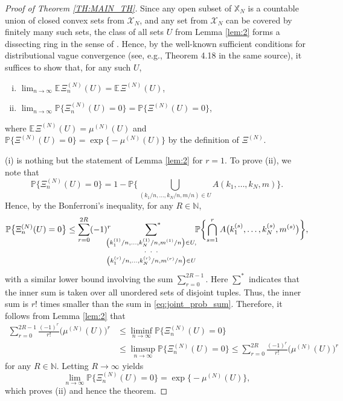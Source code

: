 \documentclass[11pt]{article}
\newcommand{\hs}{\hspace{1pt}}
\newcommand{\X}{\mathbb{X}}
\newcommand{\N}{\mathbb{N}}
\newcommand{\E}{\mathbb{E}}
\newcommand{\1}[1][]{
	\ifx&#1&\mathds{1}
	\else\mathds{1}\left\{#1\right\}\fi}
\theoremstyle{definition}
\theoremstyle{remark}
\numberwithin{equation}{section}
\begin{document}
	\begin{proof}[Proof of Theorem \ref{TH:MAIN_TH}]
		Since any open subset of $\X_N$ is a countable union of closed convex sets from $\mathcal X_N$,
		and any set from $\mathcal X_N$ can be covered by finitely many such sets, the class of all sets $U$ from
		Lemma \ref{lem:2} forms a dissecting ring in the sense of \cite[p.~24]{K17}.
		Hence, by the well-known sufficient conditions for distributional vague convergence
		(see, e.g., Theorem 4.18 in the same source), it suffices to show that, for any such $U$,
		\begin{enumerate}[(i)]
			\item $\lim_{n\to\infty}\E\hs\Xi_n^{(N)}(U) = \E\hs\Xi^{(N)}(U)$,
			\item $\lim_{n\to\infty}\mathbb{P}\bigl\{\Xi_n^{(N)}(U)=0\bigr\} = \mathbb{P}\bigl\{\Xi^{(N)}(U)=0\bigr\}$,
		\end{enumerate}
		where $\E\hs\Xi^{(N)}(U) = \mu^{(N)}(U)$ and $\mathbb{P}\bigl\{\Xi^{(N)}(U)=0\bigr\} = \exp\bigl\{-\mu^{(N)}(U)\bigr\}$        
		by the definition of $\Xi^{(N)}$.
		
		(i) is nothing but the statement of Lemma \ref{lem:2} for $r=1$. To prove (ii), we note that        
		\begin{equation*}
			\mathbb{P}\bigl\{\Xi_n^{(N)}(U)=0\bigr\} = 
			1 - \mathbb{P}\biggl\{\bigcup_{(k_1/n,\ldots,k_N/n,m/n)\in U}\!\!\!A(k_1,\dots,k_N,m)\biggr\}.
		\end{equation*}
		Hence, by the Bonferroni's inequality, for any $R\in\N$, 
		\begin{equation*}
			\mathbb{P}\bigl\{\Xi_n^{(N)}(U)=0\bigr\}\le \sum_{r=0}^{2R}(-1)^r\!\!
			\sideset{}{^*}\sum_{\substack{
					\left(k_1^{(1)}/n,\ldots,k_N^{(1)}/n, m^{(1)}/n\right)\in U,\\[2pt]
					\cdot\;\;\cdot\;\;\cdot\\[2pt]
					\left(k_1^{(r)}/n,\ldots,k_N^{(r)}/n, m^{(r)}/n\right)\in U
			}}\!\!
			\mathbb{P}\biggl\{\bigcap_{s=1}^r A{\bigl(k_1^{(s)}, \ldots,k_N^{(s)},m^{(s)}\bigr)}\biggr\},
		\end{equation*}
		with a similar lower bound involving the sum $\sum_{r=0}^{2R-1}$. Here $\sum^*$ indicates that the inner sum
		is taken over all unordered sets of disjoint tuples. Thus, the inner sum is $r!$ times smaller than the sum
		in \eqref{eq:joint_prob_sum}. Therefore, it follows from Lemma \ref{lem:2} that
		\begin{align*}
			\sum_{r=0}^{2R-1}\frac{(-1)^r}{r!} \bigl(\mu^{(N)}(U)\bigr)^r&\le
			\liminf_{n\to\infty}\mathbb{P}\bigl\{\Xi_n^{(N)}(U)=0
			\bigr\}\\
			&\le\limsup_{n\to\infty}\mathbb{P}\bigl\{\Xi_n^{(N)}(U)=0\bigr\}            
			\le\sum_{r=0}^{2R}\frac{(-1)^r}{r!} \bigl(\mu^{(N)}(U)\bigr)^r
		\end{align*}
		for any $R\in\N$. Letting $R \to \infty$ yields
		\begin{equation*}
			\lim_{n\to\infty}\mathbb{P}\bigl\{\Xi_n^{(N)}(U)=0\bigr\} = \exp\bigl\{-\mu^{(N)}(U)\bigr\},
		\end{equation*}
		which proves (ii) and hence the theorem.
	\end{proof}
	
\end{document}
